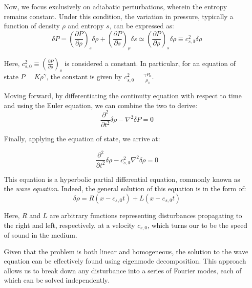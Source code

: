 Now, we focus exclusively on adiabatic perturbations, wherein the entropy remains constant. Under this condition, the variation in pressure, typically a function of density \( \rho \) and entropy \( s \), can be expressed as:
%
\begin{equation}
\delta P = \left( \frac{\partial P}{\partial \rho} \right)_s \delta \rho + \left( \frac{\partial P}{\partial s} \right)_\rho \delta s \simeq \left( \frac{\partial P}{\partial \rho} \right)_s \delta \rho \equiv c_{s,0}^2 \delta \rho
\end{equation}

Here, \( c_{s,0}^2 \equiv  \left( \frac{\partial P}{\partial \rho} \right)_s \) is considered a constant. In particular, for an equation of state \( P = K \rho^\gamma \), the constant is given by \( c_{s,0}^2 = \frac{\gamma P_0}{\rho_0} \).

Moving forward, by differentiating the continuity equation with respect to time and using the Euler equation, we can combine the two to derive:
%
\begin{equation}
\frac{\partial^2}{\partial t^2} \delta \rho - \nabla^2 \delta P = 0
\end{equation}

Finally, applying the equation of state, we arrive at:
%
\begin{remark}
\begin{equation}
\frac{\partial^2}{\partial t^2} \delta \rho - c_{s,0}^2 \nabla^2 \delta \rho = 0
\end{equation}
\end{remark}

This equation is a hyperbolic partial differential equation, commonly known as the \emph{wave equation}. 
%
Indeed, the general solution of this equation is in the form of:
%
\begin{equation}
\delta \rho = R(x - c_{s,0} t) + L (x + c_{s,0} t)
\end{equation}

Here, \( R \) and \( L \) are arbitrary functions representing disturbances propagating to the right and left, respectively, at a velocity \( c_{s,0} \), which turns our to be the speed of sound in the medium.

Given that the problem is both linear and homogeneous, the solution to the wave equation can be effectively found using eigenmode decomposition. This approach allows us to break down any disturbance into a series of Fourier modes, each of which can be solved independently.

